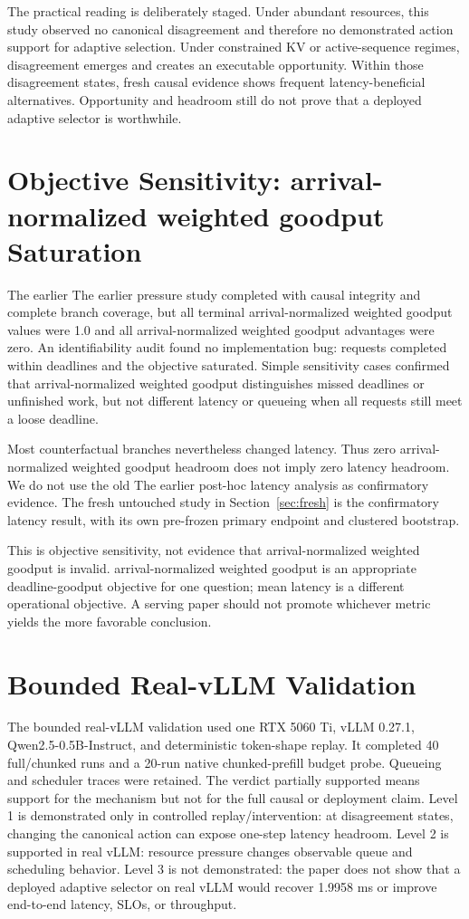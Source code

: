 \documentclass[preprint,12pt]{elsarticle}
\begin{document}
The practical reading is deliberately staged. Under abundant resources, this
study observed no canonical disagreement and therefore no demonstrated action
support for adaptive selection. Under constrained KV or active-sequence
regimes, disagreement emerges and creates an executable opportunity. Within
those disagreement states, fresh causal evidence shows frequent
latency-beneficial alternatives. Opportunity and headroom still do not prove
that a deployed adaptive selector is worthwhile.

\section{Objective Sensitivity: arrival-normalized weighted goodput Saturation}
\label{sec:anwg}

The earlier The earlier pressure study completed with causal integrity and
complete branch coverage, but all terminal arrival-normalized weighted goodput values were 1.0 and all arrival-normalized weighted goodput
advantages were zero. An identifiability audit found no implementation bug:
requests completed within deadlines and the objective saturated. Simple
sensitivity cases confirmed that arrival-normalized weighted goodput distinguishes missed deadlines or
unfinished work, but not different latency or queueing when all requests
still meet a loose deadline.

Most counterfactual branches nevertheless changed latency. Thus zero arrival-normalized weighted goodput
headroom does not imply zero latency headroom. We do not use the old The earlier
post-hoc latency analysis as confirmatory evidence. The fresh untouched study
in Section~\ref{sec:fresh} is the confirmatory latency result, with its own
pre-frozen primary endpoint and clustered bootstrap.

This is objective sensitivity, not evidence that arrival-normalized weighted goodput is invalid. arrival-normalized weighted goodput is an
appropriate deadline-goodput objective for one question; mean latency is a
different operational objective. A serving paper should not promote whichever
metric yields the more favorable conclusion.

\section{Bounded Real-vLLM Validation}
\label{sec:real}

The bounded real-vLLM validation used one RTX 5060 Ti, vLLM 0.27.1,
Qwen2.5-0.5B-Instruct, and deterministic token-shape replay. It completed
40 full/chunked runs and a 20-run native chunked-prefill budget probe.
Queueing and scheduler traces were retained. The verdict
partially supported means support for the mechanism but not for the full
causal or deployment claim. Level 1 is demonstrated only in controlled
replay/intervention: at disagreement states, changing the canonical action can
expose one-step latency headroom. Level 2 is supported in real vLLM:
resource pressure changes observable queue and scheduling behavior. Level 3
is not demonstrated: the paper does not show that a deployed adaptive
selector on real vLLM would recover 1.9958 ms or improve end-to-end latency,
SLOs, or throughput.
\end{document}

